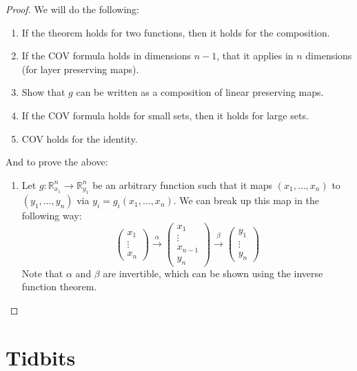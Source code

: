 \documentclass{article}
\numberwithin{equation}{section}
\begin{document}
\begin{proof}
    We will do the following:
    \begin{enumerate}
        \item If the theorem holds for two functions, then it holds for the composition. 
        \item If the COV formula holds in dimensions $n-1$, that it applies in $n$ dimensions (for layer preserving maps).
        \item Show that $g$ can be written as a composition of linear preserving maps.
        \item If the COV formula holds for small sets, then it holds for large sets.
        \item COV holds for the identity.
    \end{enumerate}
    And to prove the above:
    \begin{enumerate}
         \item Let $g:\mathbb{R}^n_{x_1}\rightarrow \mathbb{R}^n_{y_1}$ be an arbitrary function such that it maps $(x_1,\dots,x_n)$ to $(y_1,\dots,y_n)$ via $y_i = g_i(x_1,\dots,x_n)$. We can break up this map in the following way:
         \begin{equation}
             \begin{pmatrix}
                 x_1 \\ \vdots \\ x_n
             \end{pmatrix}
            \xrightarrow[]{\alpha}
            \begin{pmatrix}
                x_1 \\ \vdots \\ x_{n-1} \\ y_n
            \end{pmatrix}
            \xrightarrow[]{\beta}
            \begin{pmatrix}
                y_1 \\ \vdots \\ y_{n}
            \end{pmatrix}
         \end{equation}
         Note that $\alpha$ and $\beta$ are invertible, which can be shown using the inverse function theorem.
    \end{enumerate}
\end{proof}
\section{Tidbits}
\end{document}
